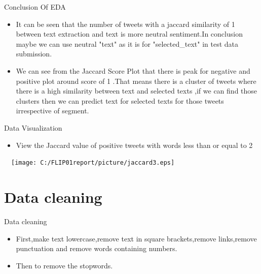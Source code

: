 \documentclass[
 size=14pt,
 paper=smartboard,  %
 mode=present, 		%
 display=slides, 	%
 style=tuliplab,  	%
 pauseslide,
 fleqn,leqno]{powerdot}
\begin{document}
\begin{slide}[toc=,bm=]{Conclusion Of EDA}
\begin{itemize}
\item
It can be seen that the number of tweets with a jaccard similarity of 1 between text extraction and text is more neutral sentiment.In conclusion maybe we can use neutral "text" as it is for "selected_text" in test data submission.
\item
We can see from the Jaccard Score Plot that there is peak for negative and positive plot around score of 1 .That means there is a cluster of tweets where there is a high similarity between text and selected texts ,if we can find those clusters then we can predict text for selected texts for those tweets irrespective of segment.
\end{itemize}
\end{slide}

\begin{slide}[toc=,bm=]{Data Visualization}
\begin{itemize}
\item
View the Jaccard value of positive tweets with words less than or equal to 2
\end{itemize}
\begin{center}
  \texttt{[image: C:/FLIP01report/picture/jaccard3.eps]}
\end{center}
\end{slide}

\section{Data cleaning}


\begin{slide}[toc=,bm=]{Data cleaning}
\begin{itemize}
\item
First,make text lowercase,remove text in square brackets,remove links,remove punctuation and remove words containing numbers.
\item
Then to remove the stopwords.
\end{itemize}
\end{slide}
\end{document}
